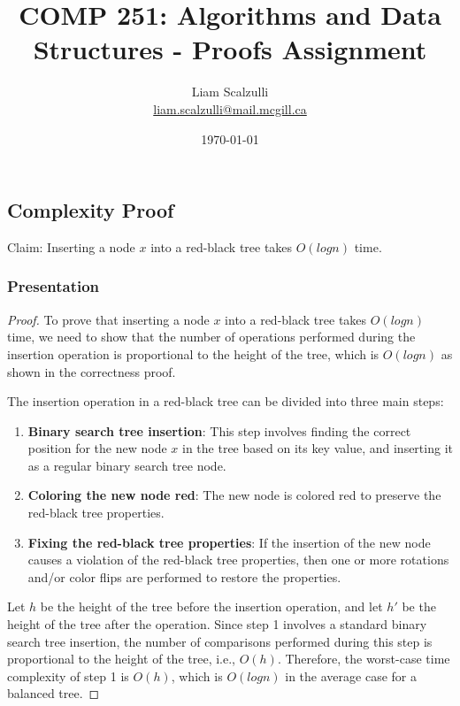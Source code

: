 \documentclass[10pt]{article}
\title{COMP
251:
Algorithms
and
Data
Structures
-
Proofs
Assignment}
\author{Liam
Scalzulli\\
\href{mailto:liam.scalzulli@mail.mcgill.ca}{liam.scalzulli@mail.mcgill.ca}}
\date{\today}
\begin{document}
  \maketitle


  \subsection*{Complexity Proof}


  Claim: Inserting a node $x$ into a red-black tree takes $O(log n)$ time.

  \subsubsection*{Presentation}


  \begin{proof}
    To prove that inserting a node $x$ into a red-black tree takes $O(log n)$ time,
    we need to show that the number of operations performed during the insertion
    operation is proportional to the height of the tree, which is $O(logn)$ as shown
    in the correctness proof.

    \spacing
    \noindent
    The insertion operation in a red-black tree can be divided into three main steps:

    \begin{enumerate}
      \item \textbf{Binary search tree insertion}: This step involves finding the
        correct position for the new node $x$ in the tree based on its key value,
        and inserting it as a regular binary search tree node.

      \item \textbf{Coloring the new node red}: The new node is colored red to preserve
        the red-black tree properties.

      \item \textbf{Fixing the red-black tree properties}: If the insertion of the
        new node causes a violation of the red-black tree properties, then one
        or more rotations and/or color flips are performed to restore the
        properties.
    \end{enumerate}

    \noindent
    Let $h$ be the height of the tree before the insertion operation, and let $h'$
    be the height of the tree after the operation. Since step 1 involves a
    standard binary search tree insertion, the number of comparisons performed during
    this step is proportional to the height of the tree, i.e., $O(h)$. Therefore,
    the worst-case time complexity of step 1 is $O(h)$, which is $O(logn)$ in the
    average case for a balanced tree.


\end{proof}
\end{document}

